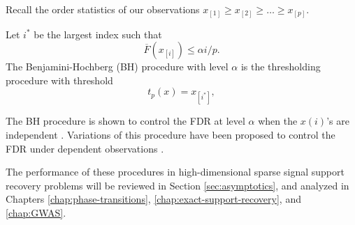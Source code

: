 Recall the order statistics of our observations $x_{[1]} \ge x_{[2]}  \ge \ldots \ge x_{[p]}$.
\begin{definition} \label{def:BH}
Let $i^*$ be the largest index such that
$$
\overline{F}(x_{[i]}) \le \alpha i/p.
$$
The Benjamini-Hochberg (BH) procedure with level $\alpha$ is the thresholding procedure with threshold
\begin{equation} \label{eq:BH-procedure}
    t_p(x) = x_{[i^*]},
\end{equation}
\end{definition}
The \ac{BH} procedure is shown to control the FDR at level $\alpha$ when the $x(i)$'s are independent \citep{benjamini1995controlling}. 
 Variations of this procedure have been proposed to control the \ac{FDR} under  dependent observations \citep{benjamini2001control}.


The performance of these procedures in high-dimensional sparse signal support recovery problems will be reviewed in Section \ref{sec:asymptotics}, and analyzed in Chapters \ref{chap:phase-transitions}, \ref{chap:exact-support-recovery}, and \ref{chap:GWAS}.

